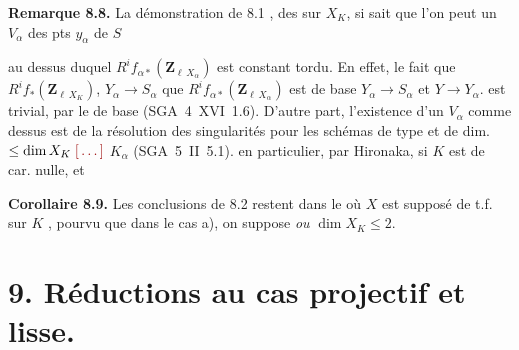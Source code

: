 \documentclass[11pt,a4paper]{article}
\begin{document}
\textbf{Remarque 8.8.} La démonstration de 8.1 \ill{} \ill{},  \ill{} des  sur $X_K$, si \ill{} \ill{} sait que l'on peut \ill{} un \ill{} \ill{} $V_\alpha$ des pts  $y_\alpha$ de $S$ \ill{}

au dessus duquel  $R^i f_{\alpha *}(\mathbf{Z}_{\ell\, X_\alpha})$ est constant tordu. En effet, le fait que  $R^i f_*(\mathbf{Z}_{\ell\, X_K})$, \ill{} \ill{} \ill{} \ill{}  \struck{$\to$} $Y_\alpha \to S_\alpha$  que $R^i f_{\alpha *}(\mathbf{Z}_{\ell\, X_\alpha})$ est \ill{} \ill{} \ill{} \ill{} de base $Y_\alpha \to S_\alpha$ et $Y \to Y_\alpha$. \ill{} \ill{} est trivial, par le \ill{} \ill{} de base \ill{} \ill{} \ill{} \ill{} \ill{} \ill{} \ill{} (SGA~4~XVI~1.6).   D'autre part, l'existence d'un $V_\alpha$ comme dessus est \ill{} \ill{} \ill{} \ill{} de la résolution des singularités  pour les schémas de type  et de dim. \ill{} $\leq \dim X_K \; \ill{}$  $K_\alpha$ (SGA~5~II~5.1).  \struck{\ill{}} en particulier, par Hironaka, si $K$ est de car. nulle, et 


\textbf{Corollaire 8.9.} Les conclusions de 8.2 restent  dans le  où $X$ est  supposé de t.f. sur $K$ , pourvu que dans le cas a), on suppose  \emph{ou} $\dim X_K \leq 2$.

\section*{9. Réductions au cas projectif et lisse.}
\end{document}
